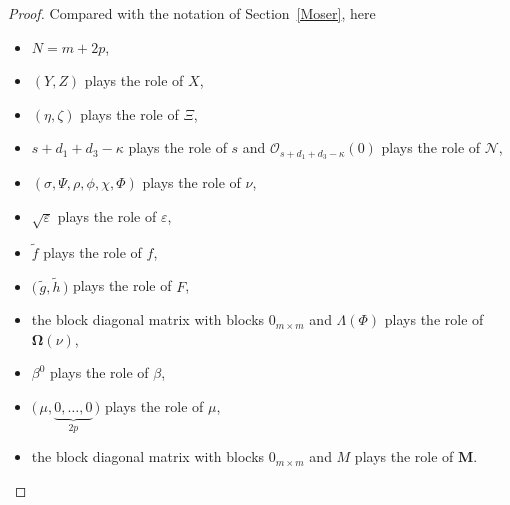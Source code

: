 \documentclass[12pt,reqno]{amsart}
\theoremstyle{definition}
\begin{document}
\begin{proof}
Compared with the notation of Section~\ref{Moser}, here
\begin{itemize}
\item $N=m+2p$,
\item $(Y,Z)$ plays the role of $X$,
\item $(\eta,\zeta)$ plays the role of $\Xi$,
\item $s+d_1+d_3-\kappa$ plays the role of $s$ and ${\mathcal O}_{s+d_1+d_3-\kappa}(0)$
plays the role of ${\mathcal N}$,
\item $(\sigma,\Psi,\rho,\phi,\chi,\Phi)$ plays the role of $\nu$,
\item ${\sqrt{\varepsilon}}$ plays the role of ${\varepsilon}$,
\item ${\widetilde{f}}$ plays the role of $f$,
\item $\bigl(\,{\widetilde{g}},{\widetilde{h}}\,\bigr)$ plays the role of $F$,
\item the block diagonal matrix with blocks $0_{m\times m}$ and
$\Lambda(\Phi)$ plays the role of ${\mathbf{\Omega}}(\nu)$,
\item $\beta^0$ plays the role of $\beta$,
\item $\bigl(\, \mu,\underbrace{0,\ldots,0}_{2p} \,\bigr)$ plays the role of
$\mu$,
\item the block diagonal matrix with blocks $0_{m\times m}$ and $M$ plays the
role of ${\mathbf M}$.
\end{itemize}


\end{proof}
\end{document}
